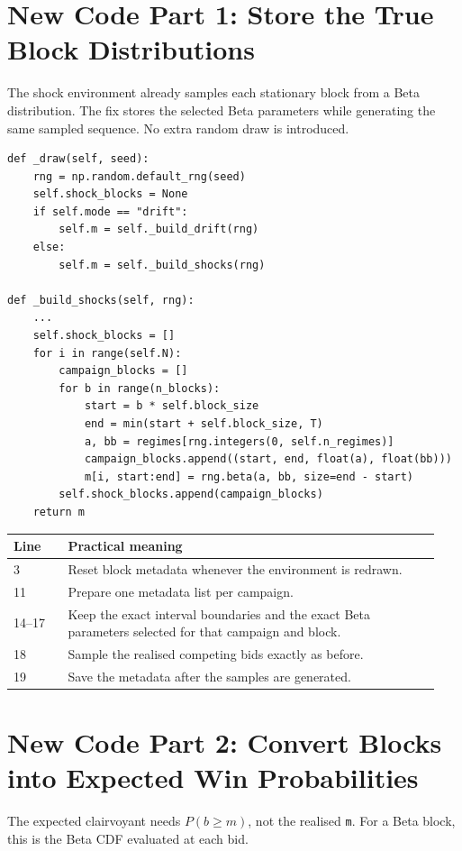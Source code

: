 \documentclass[10pt,a4paper]{article}
\begin{document}
\section{New Code Part 1: Store the True Block Distributions}
The shock environment already samples each stationary block from a Beta distribution. The fix stores the selected Beta parameters while generating the same sampled sequence. No extra random draw is introduced.

\begin{lstlisting}[style=goodpython]
def _draw(self, seed):
    rng = np.random.default_rng(seed)
    self.shock_blocks = None
    if self.mode == "drift":
        self.m = self._build_drift(rng)
    else:
        self.m = self._build_shocks(rng)

def _build_shocks(self, rng):
    ...
    self.shock_blocks = []
    for i in range(self.N):
        campaign_blocks = []
        for b in range(n_blocks):
            start = b * self.block_size
            end = min(start + self.block_size, T)
            a, bb = regimes[rng.integers(0, self.n_regimes)]
            campaign_blocks.append((start, end, float(a), float(bb)))
            m[i, start:end] = rng.beta(a, bb, size=end - start)
        self.shock_blocks.append(campaign_blocks)
    return m
\end{lstlisting}

\begin{tabular}{@{}p{0.12\linewidth}p{0.82\linewidth}@{}}
\toprule
Line & Practical meaning \\
\midrule
3 & Reset block metadata whenever the environment is redrawn. \\
11 & Prepare one metadata list per campaign. \\
14--17 & Keep the exact interval boundaries and the exact Beta parameters selected for that campaign and block. \\
18 & Sample the realised competing bids exactly as before. \\
19 & Save the metadata after the samples are generated. \\
\bottomrule
\end{tabular}

\section{New Code Part 2: Convert Blocks into Expected Win Probabilities}
The expected clairvoyant needs \(P(b \ge m)\), not the realised \texttt{m}. For a Beta block, this is the Beta CDF evaluated at each bid.
\end{document}
